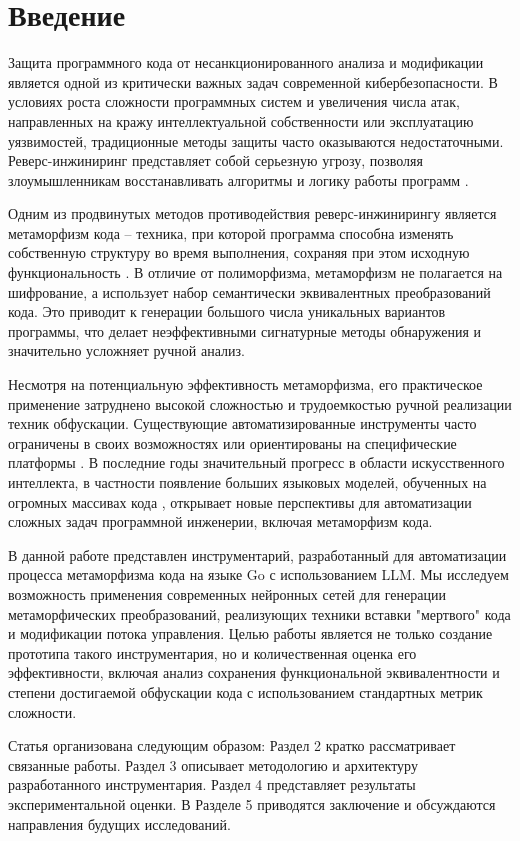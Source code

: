 
\section{Введение}
\label{sec:intro}
Защита программного кода от несанкционированного анализа и модификации является одной из критически важных задач современной кибербезопасности. В условиях роста сложности программных систем и увеличения числа атак, направленных на кражу интеллектуальной собственности или эксплуатацию уязвимостей, традиционные методы защиты часто оказываются недостаточными. Реверс-инжиниринг представляет собой серьезную угрозу, позволяя злоумышленникам восстанавливать алгоритмы и логику работы программ \cite{Collberg97Survey}.

Одним из продвинутых методов противодействия реверс-инжинирингу является метаморфизм кода – техника, при которой программа способна изменять собственную структуру во время выполнения, сохраняя при этом исходную функциональность \cite{Szor05Metamorphic}. В отличие от полиморфизма, метаморфизм не полагается на шифрование, а использует набор семантически эквивалентных преобразований кода. Это приводит к генерации большого числа уникальных вариантов программы, что делает неэффективными сигнатурные методы обнаружения и значительно усложняет ручной анализ.

Несмотря на потенциальную эффективность метаморфизма, его практическое применение затруднено высокой сложностью и трудоемкостью ручной реализации техник обфускации. Существующие автоматизированные инструменты часто ограничены в своих возможностях или ориентированы на специфические платформы \cite{Schrittwieser16Survey}. В последние годы значительный прогресс в области искусственного интеллекта, в частности появление больших языковых моделей, обученных на огромных массивах кода \cite{Chen21Evaluating}, открывает новые перспективы для автоматизации сложных задач программной инженерии, включая метаморфизм кода.

В данной работе представлен инструментарий, разработанный для автоматизации процесса метаморфизма кода на языке Go с использованием LLM. Мы исследуем возможность применения современных нейронных сетей для генерации метаморфических преобразований, реализующих техники вставки "мертвого" кода и модификации потока управления. Целью работы является не только создание прототипа такого инструментария, но и количественная оценка его эффективности, включая анализ сохранения функциональной эквивалентности и степени достигаемой обфускации кода с использованием стандартных метрик сложности.

Статья организована следующим образом: Раздел 2 кратко рассматривает связанные работы. Раздел 3 описывает методологию и архитектуру разработанного инструментария. Раздел 4 представляет результаты экспериментальной оценки. В Разделе 5 приводятся заключение и обсуждаются направления будущих исследований.
